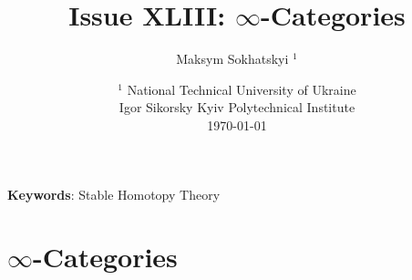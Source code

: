 \documentclass{article}
\begin{document}
\title{Issue XLIII: $\infty$-Categories}
\author{Maksym Sokhatskyi $^1$}
\date{ $^1$ National Technical University of Ukraine \\
       \small Igor Sikorsky Kyiv Polytechnical Institute \\
       \today }

\maketitle

\begin{abstract}
\end{abstract}

{\bf Keywords}: Stable Homotopy Theory

\ifincludeTOC
  \tableofcontents
\fi

\section{$\infty$-Categories}
\end{document}
